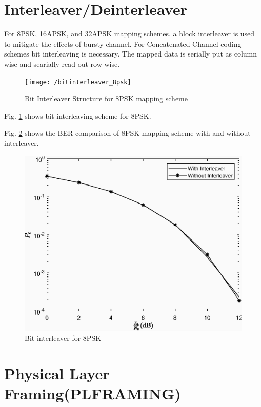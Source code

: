 \documentclass[journal,12pt,twocolumn]{IEEEtran}
\begin{document}
\section{Interleaver/Deinterleaver}
For 8PSK, 16APSK, and 32APSK mapping schemes, a
block interleaver  \cite{dvb} is used to mitigate the effects of bursty channel. For Concatenated Channel coding schemes bit interleaving is necessary. The mapped data is serially put as column wise and searially read out row wise. 
%
\begin{figure}[!ht]
\begin{center}
\texttt{[image: /bitinterleaver\_8psk]}
\end{center}
\caption{Bit Interleaver Structure for 8PSK mapping scheme}
\label{fig:bit8psk}
\end{figure}
Fig. \ref{fig:bit8psk} shows bit interleaving scheme for 8PSK.


Fig. \ref{fig:inter} 
%
shows the BER comparison of 8PSK mapping scheme with  and without interleaver. 
\begin{figure}[!ht]
\begin{center}
\includegraphics[width=\columnwidth]{./figs/Interleaver.eps}
\end{center}
\caption{Bit interleaver for 8PSK}
\label{fig:inter}
\end{figure}


\section{Physical Layer Framing(PLFRAMING)}
\end{document}
